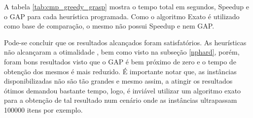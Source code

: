 \documentclass[a4paper, 12pt]{article}
\begin{document}
A tabela \ref{tab:cmp_greedy_grasp} mostra o tempo total em segundos, Speedup e o GAP para cada heurística programada.
Como o algoritmo Exato é utilizado como base de comparação, o mesmo não possui Speedup e nem GAP.
\begin{table}[htbp]
    \centering
\end{table}

Pode-se concluir que os resultados alcançados foram satisfatórios. As heurísticas não alcançaram a otimalidade
, bem como visto na subseção \ref{nphard}, porém, foram bons resultados visto que o GAP é bem próximo de zero
e o tempo de obtenção dos mesmos é mais reduzido. É importante
notar que, as instâncias disponibilizadas não são tão grandes e mesmo assim, a atingir os resultados ótimos
demandou bastante tempo, logo, é inviável utilizar um algoritmo exato para a obtenção de tal resultado num cenário
onde as instâncias ultrapassam 100000 itens por exemplo.

{}

\end{document}

